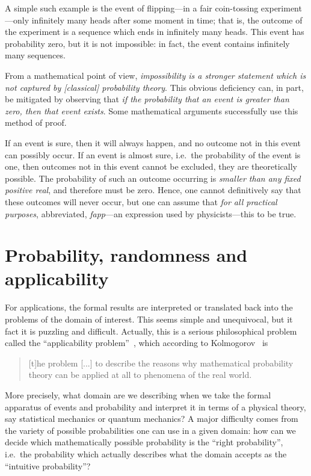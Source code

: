 \documentclass[11pt]{article}
\begin{document}
A simple such example  is the event of flipping---in a fair coin-tossing experiment---only infinitely many heads after some moment in time; that is, the outcome of the experiment is a sequence which ends in infinitely many heads. This event has probability zero, but it is not impossible: in fact, the event contains infinitely many sequences.

From a  mathematical point of view, {\em impossibility is a stronger statement which is not captured  by [classical] probability theory}.  This obvious deficiency can, in part, be mitigated by observing that {\em  if  the probability that an event is greater than zero, then that event exists}. Some mathematical arguments successfully use this method of proof.

If an event is sure, then it will always happen, and no outcome not in this event can possibly occur. If an event is almost sure, i.e.\ the probability of the event is one, then outcomes not in this event cannot be excluded, they are theoretically possible. The probability of such an outcome occurring is {\em smaller than any fixed positive real}, and therefore must be zero. Hence, one cannot definitively say that these outcomes will never occur, but one can assume  that  {\em for all practical purposes}, abbreviated, {\em fapp}---an expression used by physicists---this to be true.


\section{Probability, randomness and applicability}
For applications, the formal results are interpreted or translated back into the problems of the domain of interest. This seems simple and unequivocal, but it fact it is  puzzling and difficult. Actually, this is a serious philosophical problem called  the ``applicability problem''~\cite{Porter-2014}, which   according to Kolmogorov~\cite{springerlink:10.1007/BFb0072897} is

\begin{quote}
[t]he problem [...] to describe the reasons why mathematical probability theory can be applied at all to phenomena of the real world.
\end{quote}

More precisely, what domain are we describing  when we take the formal apparatus of events and probability and interpret it in terms of a physical theory, say statistical mechanics or quantum mechanics? A major  difficulty comes from the variety of possible probabilities one can use in a given domain: how can we decide which mathematically possible probability is the ``right probability'', i.e.\ the probability which actually describes what the domain accepts as  the ``intuitive probability''?
\end{document}
